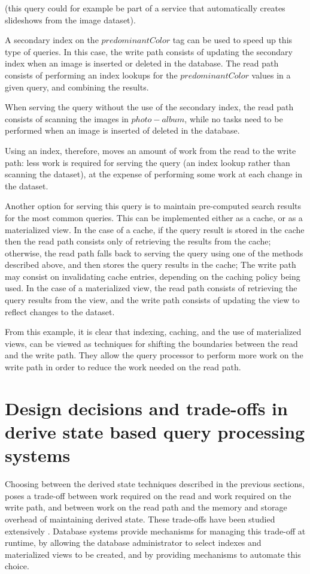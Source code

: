 \noindent
(this query could for example be part of a service that automatically creates slideshows from the image dataset).

A secondary index on the $predominantColor$ tag can be used to speed up this type of queries.
In this case, the write path consists of updating the secondary index when an image is inserted or deleted in the database.
The read path consists of performing an index lookups for the $predominantColor$ values in a given query,
and combining the results.

When serving the query without the use of the secondary index, the read path consists of scanning the images in $photo-album$,
while no tasks need to be performed when an image is inserted of deleted in the database.

Using an index, therefore, moves an amount of work from the read to the write path:
less work is required for serving the query (an index lookup rather than scanning the dataset), at the expense of performing
some work at each change in the dataset.

Another option for serving this query is to maintain pre-computed search results for the most common queries.
This can be implemented either as a cache, or as a materialized view.
In the case of a cache, if the query result is stored in the cache then the read path consists only of retrieving the
results from the cache;
otherwise, the read path falls back to serving the query using one of the methods described above,
and then stores the query results in the cache;
The write path may consist on invalidating cache entries, depending on the caching policy being used.
In the case of a materialized view, the read path consists of retrieving the query results from the view,
and the write path consists of updating the view to reflect changes to the dataset.

From this example, it is clear that indexing, caching, and the use of materialized views,
can be viewed as techniques for shifting the boundaries between the read and the write path.
They allow the query processor to perform more work on the write path in order to reduce the work needed on the read path.


\section{Design decisions and trade-offs in derive state based query processing systems}

Choosing between the derived state techniques described in the previous sections,
poses a trade-off between work required on the read and work required on the write path,
and between work on the read path and the memory and storage overhead of maintaining derived state.
These trade-offs have been studied extensively \cite{valentin:db2advisor, chaudhuri:decadeselftuning}.
Database systems provide mechanisms for managing this trade-off at runtime, by allowing the database administrator
to select indexes and materialized views to be created, and by providing mechanisms to automate this choice.

